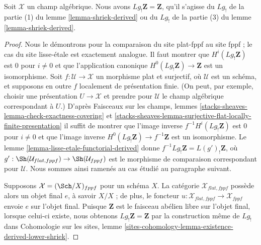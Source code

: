 \begin{lemma}
\label{lemma-higher-shriek-Z}
Soit $\mathcal{X}$ un champ algébrique. Nous avons
$Lg_!\mathbf{Z} = \mathbf{Z}$, qu'il s'agisse du $Lg_!$ de la partie (1) du
lemme \ref{lemma-shriek-derived} ou du $Lg_!$ de la partie (3) du lemme
\ref{lemma-shriek-derived}.
\end{lemma}

\begin{proof}
Nous le démontrons pour la comparaison du site plat-fppf au site fppf ; le cas
du site lisse-\'etale est exactement analogue. Il faut montrer que
$H^i(Lg_!\mathbf{Z})$ est $0$ pour $i \not = 0$ et que l'application canonique
$H^0(Lg_!\mathbf{Z}) \to \mathbf{Z}$ est un isomorphisme. Soit
$f : \mathcal{U} \to \mathcal{X}$ un morphisme plat et surjectif, où
$\mathcal{U}$ est un schéma, et supposons en outre $f$ localement de
présentation finie. (On peut, par exemple, choisir une présentation
$U \to \mathcal{X}$ et prendre pour $\mathcal{U}$ le champ algébrique
correspondant à $U$.) D'après Faisceaux sur les champs, lemmes
\ref{stacks-sheaves-lemma-check-exactness-covering} et
\ref{stacks-sheaves-lemma-surjective-flat-locally-finite-presentation}
il suffit de montrer que l'image inverse $f^{-1}H^i(Lg_!\mathbf{Z})$ est $0$
pour $i \not = 0$ et que l'image inverse
$H^0(Lg_!\mathbf{Z}) \to f^{-1}\mathbf{Z}$ est un isomorphisme. Le lemme
\ref{lemma-lisse-etale-functorial-derived} donne
$f^{-1}Lg_!\mathbf{Z} = L(g')_!\mathbf{Z}$, où
$g' : \Sh(\mathcal{U}_{flat, fppf}) \to \Sh(\mathcal{U}_{fppf})$
est le morphisme de comparaison correspondant pour $\mathcal{U}$. Nous sommes
ainsi ramenés au cas étudié au paragraphe suivant.

\medskip\noindent
Supposons $\mathcal{X} = (\Sch/X)_{fppf}$ pour un schéma $X$. La catégorie
$\mathcal{X}_{flat, fppf}$ possède alors un objet final $e$, à savoir $X/X$ ;
de plus, le foncteur
$u : \mathcal{X}_{flat, fppf} \to \mathcal{X}_{fppf}$ envoie $e$ sur l'objet
final. Puisque $\mathbf{Z}$ est le faisceau abélien libre sur l'objet final,
lorsque celui-ci existe, nous obtenons $Lg_!\mathbf{Z} = \mathbf{Z}$ par la
construction même de $Lg_!$ dans Cohomologie sur les sites, lemme
\ref{sites-cohomology-lemma-existence-derived-lower-shriek}.
\end{proof}

